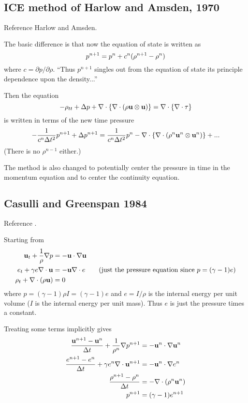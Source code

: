 \documentclass{article}
\begin{document}
\subsection{ICE method of Harlow and Amsden, 1970}

Reference Harlow and Amsden\cite{Harlow70}.


The basic difference is that now the equation of state is written as
\[
    p^{n+1} = p^n + c^n( \rho^{n+1} -\rho^n)
\]
where $c= \partial p / \partial \rho$. ``Thus $p^{n+1}$ singles out from the equation
of state its principle dependence upon the density...''

Then the equation
\[
    -\rho_{tt} + \Delta p + \nabla\cdot\left\{\nabla\cdot( \rho {\bf u}\otimes {\bf u} ) \right\} 
                  = \nabla\cdot\left\{ \nabla\cdot {\bf \tau} \right\} 
\]
is written in terms of the new time pressure
\[
   - {1\over c^n \Delta t^2} p^{n+1}  + \Delta p^{n+1} 
       = {1\over c^n \Delta t^2} p^{n} - \nabla\cdot\left\{\nabla\cdot( \rho^n {\bf u}^n\otimes {\bf u}^n ) \right\}  + ...
\]
(There is no $\rho^{n-1}$ either.)

The method is also changed to potentially center the pressure in time in the momentum equation and
to center the continuity equation.


\subsection{Casulli and Greenspan 1984}

Reference \cite{Casulli84}.

Starting from
\begin{align*}
   {\bf u}_t + {1\over\rho}\nabla p &= -{\bf u}\cdot\nabla{\bf u} \\
   e_t + \gamma e \nabla\cdot{\bf u} &= -  {\bf u}\nabla\cdot e  \qquad\mbox{(just the pressure equation since $p=(\gamma-1)e$)} \\
   \rho_t + \nabla\cdot(\rho{\bf u}) &= 0 
\end{align*}
where  $p = (\gamma-1) \rho I = (\gamma-1)e$ and $e=I/\rho$ is the internal energy per unit volume ($I$ is the
internal energy per unit mass). Thus $e$ is just the pressure times a constant. 


Treating some terms implicitly gives
\begin{align*}
 {{\bf u}^{n+1} - {\bf u}^n \over \Delta t} + {1\over\rho^n}\nabla p^{n+1} &= -{\bf u}^n\cdot\nabla{\bf u}^n \\
 {e^{n+1} - e^n \over \Delta t} + \gamma e^n \nabla\cdot{\bf u}^{n+1} &=  -{\bf u}^n\cdot\nabla e^n \\
  {\rho^{n+1} - \rho^n \over \Delta t} &= - \nabla\cdot(\rho^n{\bf u}^n)   \\
  p^{n+1} &= (\gamma-1) e^{n+1} 
\end{align*}
\end{document}
